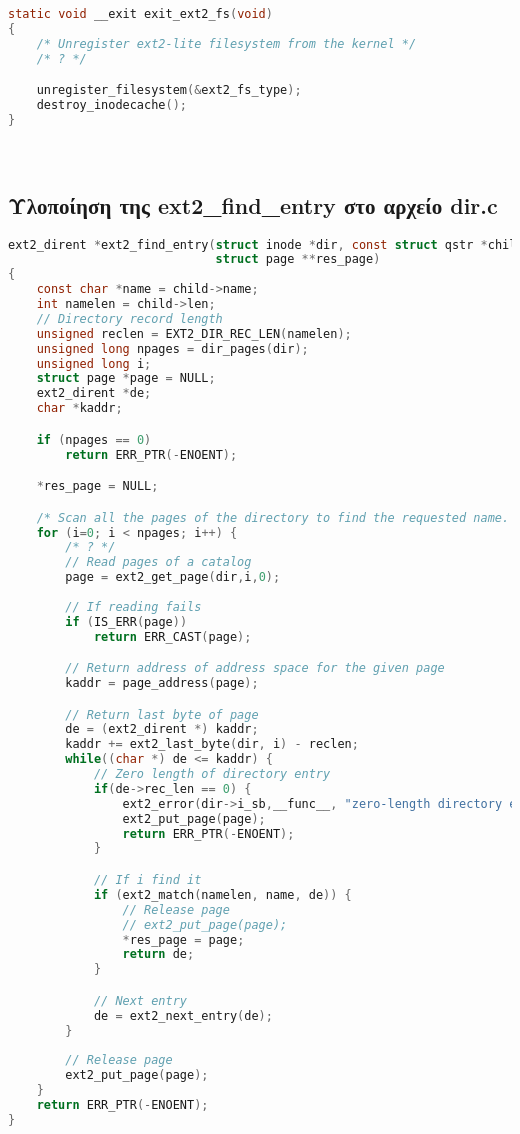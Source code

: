 \documentclass{article}
\begin{document}
\begin{enumerate}
\begin{lstlisting}[language=C]
static void __exit exit_ext2_fs(void)
{
	/* Unregister ext2-lite filesystem from the kernel */
	/* ? */

    unregister_filesystem(&ext2_fs_type);
	destroy_inodecache();
}
\end{lstlisting} \\

\subsection{Υλοποίηση της ext2\_find\_entry στο αρχείο dir.c}
\begin{lstlisting}[language=C]
ext2_dirent *ext2_find_entry(struct inode *dir, const struct qstr *child,
                             struct page **res_page)
{
	const char *name = child->name;
	int namelen = child->len;
    // Directory record length
	unsigned reclen = EXT2_DIR_REC_LEN(namelen);
	unsigned long npages = dir_pages(dir);
	unsigned long i;
	struct page *page = NULL;
	ext2_dirent *de;
	char *kaddr;

	if (npages == 0)
		return ERR_PTR(-ENOENT);

	*res_page = NULL;

	/* Scan all the pages of the directory to find the requested name. */
	for (i=0; i < npages; i++) {
		/* ? */
        // Read pages of a catalog
        page = ext2_get_page(dir,i,0);
        
        // If reading fails
        if (IS_ERR(page))
            return ERR_CAST(page);

        // Return address of address space for the given page
        kaddr = page_address(page);

        // Return last byte of page
        de = (ext2_dirent *) kaddr;
        kaddr += ext2_last_byte(dir, i) - reclen;
        while((char *) de <= kaddr) {
            // Zero length of directory entry
            if(de->rec_len == 0) {
                ext2_error(dir->i_sb,__func__, "zero-length directory entry");
                ext2_put_page(page);
                return ERR_PTR(-ENOENT);
            }

            // If i find it
            if (ext2_match(namelen, name, de)) {
                // Release page
                // ext2_put_page(page);
                *res_page = page;
                return de;
            }

            // Next entry
            de = ext2_next_entry(de);
        }
        
        // Release page
        ext2_put_page(page);
	}
	return ERR_PTR(-ENOENT);
}
\end{lstlisting} \\


\end{enumerate}
\end{document}
